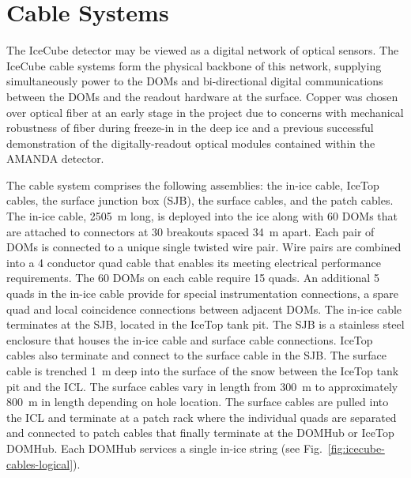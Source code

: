 
 
\section{Cable Systems}

The IceCube detector may be viewed as a digital network of optical
sensors. The IceCube cable systems form the physical backbone of this
network, supplying simultaneously power to the DOMs and bi-directional
digital communications between the DOMs and the readout hardware at the
surface. Copper was chosen over optical fiber at an early stage in the
project due to concerns with mechanical robustness of fiber during
freeze-in in the deep ice and a previous successful demonstration of the
digitally-readout optical modules contained within the AMANDA detector.

The cable system comprises the following assemblies: the in-ice cable,
IceTop cables, the surface junction box (SJB), the surface cables, and the patch
cables. The in-ice cable, 2505~m long, is deployed
into the ice along with 60 DOMs that are attached to connectors at 30
breakouts spaced 34~m apart. Each pair of DOMs is connected to a unique
single twisted wire pair. Wire pairs are combined into a 4 conductor quad
cable that enables its meeting electrical performance requirements. The 60
DOMs on each cable require 15 quads. An additional 5 quads in the
in-ice cable provide for special instrumentation connections, a spare quad
and local coincidence connections between adjacent DOMs. The in-ice
cable terminates at the SJB, located
in the IceTop tank pit. The SJB is a stainless steel
enclosure that houses the in-ice cable and surface cable
connections. IceTop cables also terminate and connect to the surface cable
in the SJB. The surface cable is trenched 1~m deep into the
surface of the snow between the IceTop tank pit and the ICL. The surface
cables vary in length from 300~m to approximately 800~m in length depending on hole location. The surface cables are
pulled into the ICL and terminate at a patch rack where the individual
quads are separated and connected to patch cables that finally terminate at the DOMHub or IceTop DOMHub. Each
DOMHub services a single in-ice string (see
Fig.~\ref{fig:icecube-cables-logical}). 

